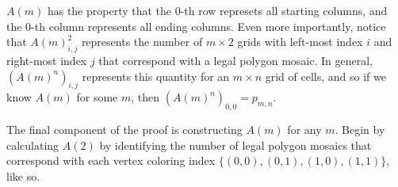 \documentclass[12pt]{article}
\theoremstyle{plain}
\theoremstyle{definition}
\theoremstyle{remark}
\theoremstyle{definition}
\newcommand{\lablnode}[3]{\node[shape=circle,draw=none,fill=none, inner sep=0pt,minimum size=0pt] (A) at ( #1 , #2 ) {#3};}
\newcommand{\lablvertex}[3]{\node[shape=circle,draw=none,fill=white, inner sep=2pt,minimum size=5pt] (A) at ( #1 , #2 ) {#3};}
\begin{document}
\begin{center}
\end{center}

$A(m)$ has the property that the $0$-th row represets all starting columns, and the $0$-th column represents all ending columns. Even more importantly, notice that $A(m)^2_{i,j}$ represents the number of $m \times 2$ grids with left-most index $i$ and right-most index $j$ that correspond with a legal polygon mosaic. In general, $(A(m)^n)_{i,j}$ represents this quantity for an $m \times n$ grid of cells, and so if we know $A(m)$ for some $m$, then $(A(m)^n)_{0,0} = p_{m,n}.$

The final component of the proof is constructing $A(m)$ for any $m$. Begin by  calculating $A(2)$ by identifying the number of legal polygon mosaics that correspond with each vertex coloring index $\{(0,0),(0,1),(1,0),(1,1)\}$, like so.
\end{document}
